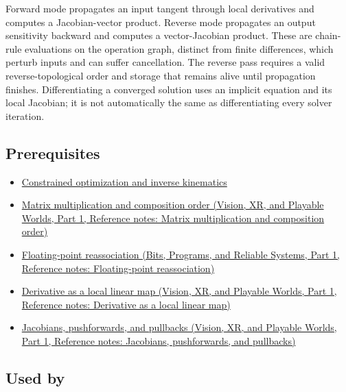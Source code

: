 \hypertarget{appendix-40df0855b4a7-phase-910-development}{}

Forward mode propagates an input tangent through local derivatives and computes a Jacobian-vector product. Reverse mode propagates an output sensitivity backward and computes a vector-Jacobian product. These are chain-rule evaluations on the operation graph, distinct from finite differences, which perturb inputs and can suffer cancellation. The reverse pass requires a valid reverse-topological order and storage that remains alive until propagation finishes. Differentiating a converged solution uses an implicit equation and its local Jacobian; it is not automatically the same as differentiating every solver iteration.

\subsection{Prerequisites}\label{appendix-40df0855b4a7-prerequisites}

\hypertarget{appendix-40df0855b4a7-prerequisites}{}

\begin{itemize}
\tightlist
\item
  \hyperref[appendix-29f4bea4c2bb]{Constrained optimization and inverse kinematics}
\item
  \href{../07-Vision-XR-and-Playable-Worlds-P01/main.pdf\#appendix-ab31ef447dbf}{Matrix multiplication and composition order (Vision, XR, and Playable Worlds, Part 1, Reference notes: Matrix multiplication and composition order)}
\item
  \href{../01-Bits-Programs-and-Reliable-Systems-P01/main.pdf\#appendix-c2ac4a84c283}{Floating-point reassociation (Bits, Programs, and Reliable Systems, Part 1, Reference notes: Floating-point reassociation)}
\item
  \href{../07-Vision-XR-and-Playable-Worlds-P01/main.pdf\#appendix-7bc181935c42}{Derivative as a local linear map (Vision, XR, and Playable Worlds, Part 1, Reference notes: Derivative as a local linear map)}
\item
  \href{../07-Vision-XR-and-Playable-Worlds-P01/main.pdf\#appendix-d8a7ddb675eb}{Jacobians, pushforwards, and pullbacks (Vision, XR, and Playable Worlds, Part 1, Reference notes: Jacobians, pushforwards, and pullbacks)}
\end{itemize}

\subsection{Used by}\label{appendix-40df0855b4a7-used-by}

